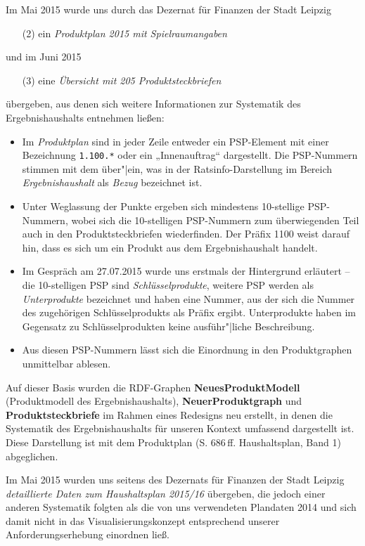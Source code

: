 \documentclass[a4paper,11pt,twoside]{article}
\begin{document}
Im Mai 2015 wurde uns durch das Dezernat für Finanzen der Stadt Leipzig
\begin{itemize}
\item [(2)] ein \emph{Produktplan 2015 mit Spielraumangaben} 
\end{itemize}
und im Juni 2015 
\begin{itemize}
\item [(3)] eine \emph{Übersicht mit 205 Produktsteckbriefen} 
\end{itemize}
übergeben, aus denen sich weitere Informationen zur Systematik des
Ergebnishaushalts entnehmen ließen: 
\begin{itemize}
\item Im \emph{Produktplan} sind in jeder Zeile entweder ein PSP-Element mit
  einer Bezeichnung \texttt{1.100.*} oder ein „Innenauftrag“ dargestellt. Die
  PSP-Nummern stimmen mit dem über"|ein, was in der Ratsinfo-Darstellung im
  Bereich \emph{Ergebnishaushalt} als \emph{Bezug} bezeichnet ist.
\item Unter Weglassung der Punkte ergeben sich mindestens 10-stellige
  PSP-Nummern, wobei sich die 10-stelligen PSP-Nummern zum überwiegenden Teil
  auch in den Produktsteckbriefen wiederfinden.  Der Präfix 1100 weist darauf
  hin, dass es sich um ein Produkt aus dem Ergebnishaushalt handelt. 
\item Im Gespräch am 27.07.2015 wurde uns erstmals der Hintergrund erläutert --
  die 10-stelligen PSP sind \emph{Schlüsselprodukte}, weitere PSP werden als
  \emph{Unterprodukte} bezeichnet und haben eine Nummer, aus der sich die
  Nummer des zugehörigen Schlüsselprodukts als Präfix ergibt. Unterprodukte
  haben im Gegensatz zu Schlüsselprodukten keine ausführ"|liche Beschreibung.
\item Aus diesen PSP-Nummern lässt sich die Einordnung in den Produktgraphen
  unmittelbar ablesen. 
\end{itemize}
Auf dieser Basis wurden die RDF-Graphen \textbf{NeuesProduktModell}
(Produktmodell des Ergebnishaushalts), \textbf{NeuerProduktgraph} und
\textbf{Produktsteckbriefe} im Rahmen eines Redesigns neu erstellt, in denen
die Systematik des Ergebnishaushalts für unseren Kontext umfassend dargestellt
ist.  Diese Darstellung ist mit dem Produktplan (S. 686\,ff. Haushaltsplan,
Band 1) abgeglichen.

Im Mai 2015 wurden uns seitens des Dezernats für Finanzen der Stadt Leipzig
\emph{detaillierte Daten zum Haushaltsplan 2015/16} übergeben, die jedoch einer
anderen Systematik folgten als die von uns verwendeten Plandaten 2014 und sich
damit nicht in das Visualisierungskonzept entsprechend unserer
Anforderungserhebung einordnen ließ. 
\end{document}
